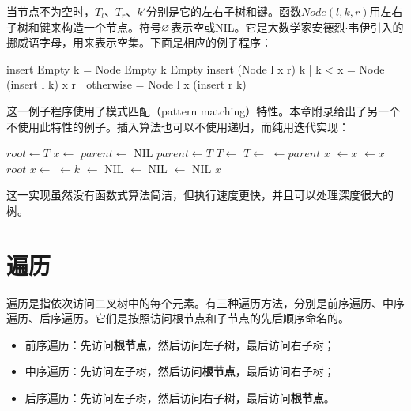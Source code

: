 \documentclass[b5paper]{ctexart}
\begin{document}
当节点不为空时，$T_l$、$T_r$、$k'$分别是它的左右子树和键。函数$Node(l, k, r)$用左右子树和键来构造一个节点。符号$\varnothing$表示空或NIL。它是大数学家安德烈$\cdot$韦伊引入的挪威语字母，用来表示空集。下面是相应的例子程序：

\begin{Haskell}
insert Empty k = Node Empty k Empty
insert (Node l x r) k | k < x = Node (insert l k) x r
                      | otherwise = Node l x (insert r k)
\end{Haskell}

这一例子程序使用了模式匹配（pattern matching）特性。本章附录给出了另一个不使用此特性的例子。插入算法也可以不使用递归，而纯用迭代实现：

\begin{algorithmic}[1]
  \State $root \gets T$
  \State $x \gets$ 
  \State $parent \gets$ NIL
    \State $parent \gets T$
      \State $T \gets $ 
    \Else
      \State $T \gets $ 
    \EndIf
  \EndWhile
  \State {} $\gets parent$
   
    \State \Return $x$
    \State {} $\gets x$
  \Else
    \State {} $\gets x$
  \EndIf
  \State \Return $root$
\EndFunction
\Statex
{}
  \State $x \gets $ 
  \State {} $ \gets k$
  \State {} $ \gets $ NIL
  \State {} $ \gets $ NIL
  \State {} $ \gets $ NIL
  \State \Return $x$
\EndFunction
\end{algorithmic}

这一实现虽然没有函数式算法简洁，但执行速度更快，并且可以处理深度很大的树。

\section{遍历}

遍历是指依次访问二叉树中的每个元素。有三种遍历方法，分别是前序遍历、中序遍历、后序遍历。它们是按照访问根节点和子节点的先后顺序命名的。

\begin{itemize}
\item 前序遍历：先访问\textbf{根节点}，然后访问左子树，最后访问右子树；
\item 中序遍历：先访问左子树，然后访问\textbf{根节点}，最后访问右子树；
\item 后序遍历：先访问左子树，然后访问右子树，最后访问\textbf{根节点}。
\end{itemize}
\end{document}
